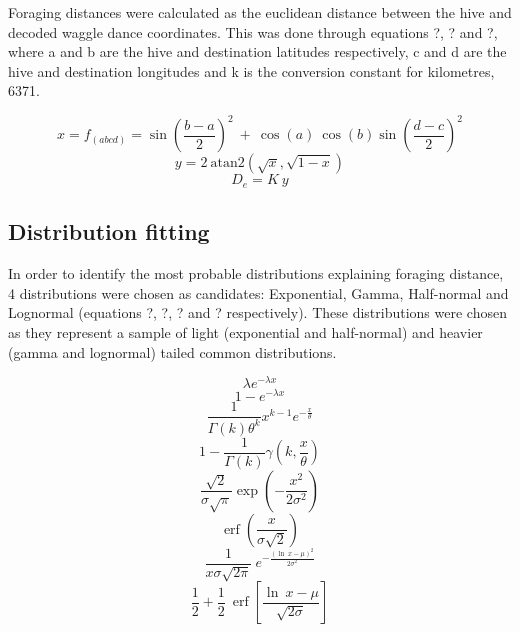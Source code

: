 \documentclass[11pt,usenames,dvipsnames,a4paper]{article}
\DeclareMathOperator\erf{erf}
\begin{document}
\begin{linenumbers}
\hspace{\parindent}
Foraging distances were calculated as the euclidean distance between the hive and decoded waggle dance coordinates. This was done through equations ?, ? and ?, where a and b are the hive and destination latitudes respectively, c and d are the hive and destination longitudes and k is the conversion constant for kilometres, 6371.
\end{linenumbers}
\begin{equation}
x = f_{(abcd)} = \sin\left(\frac{b - a}{2}\right)^2\ +\ \cos(a)\ \cos(b) \sin\left(\frac{d - c}{2}\right)^2 
\end{equation}
\begin{equation}
y = 2\ \text{atan2}(\sqrt{x}, \sqrt{1 - x})
\end{equation}
\begin{equation}
D_e = K\ y
\end{equation}

\subsection{Distribution fitting}

\begin{linenumbers}
\hspace{\parindent}
In order to identify the most probable distributions explaining foraging distance, 4 distributions were chosen as candidates: Exponential, Gamma, Half-normal and Lognormal (equations ?, ?, ? and ? respectively). These distributions were chosen as they represent a sample of light (exponential and half-normal) and heavier (gamma and lognormal) tailed common distributions.
\end{linenumbers}
\begin{equation}
\lambda e^{-\lambda x}
\end{equation}
\begin{equation}
1 - e^{-\lambda x}
\end{equation}
\begin{equation}
\frac{1}{\Gamma(k)\theta^k}x^{k-1}e^{-\frac{x}{\theta}}
\end{equation}
\begin{equation}
1 - \frac{1}{\Gamma(k)}\gamma(k,\frac{x}{\theta})
\end{equation}
\begin{equation}
\frac{\sqrt{2}}{\sigma \sqrt{\pi}} \exp \left(-\frac{x^2}{2 \sigma^2}\right)
\end{equation}
\begin{equation}
\erf\left(\frac{x}{\sigma \sqrt{2}}\right)
\end{equation}
\begin{equation}
\frac{1}{x \sigma \sqrt{2 \pi}}\ e^{- \frac{(\ln\ x - \mu)^2}{2\sigma^2}}
\end{equation}
\begin{equation}
\frac{1}{2} + \frac{1}{2}\ \erf\left[\frac{\ln\ x - \mu}{\sqrt{2 \sigma}}\right]
\end{equation}
\end{document}
